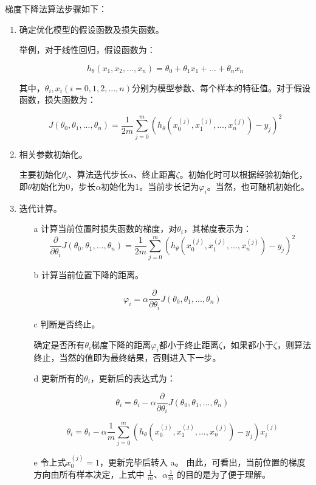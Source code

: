 梯度下降法算法步骤如下：

\begin{enumerate}
\itemsep0em

\item 确定优化模型的假设函数及损失函数。

举例，对于线性回归，假设函数为：

$$
  h_\theta(x_1,x_2,...,x_n)=\theta_0+\theta_1x_1+...+\theta_nx_n
$$

  其中，$\theta_i,x_i(i=0,1,2,...,n)$分别为模型参数、每个样本的特征值。对于假设函数，损失函数为：

$$
  J(\theta_0,\theta_1,...,\theta_n)=\frac{1}{2m}\sum^{m}_{j=0}(h_\theta (x^{(j)}_0
  	,x^{(j)}_1,...,x^{(j)}_n)-y_j)^2
$$

\item 相关参数初始化。

	主要初始化${\theta}_i$、算法迭代步长${\alpha} $、终止距离${\zeta} $。初始化时可以根据经验初始化，即${\theta} $初始化为0，步长${\alpha} $初始化为1。当前步长记为${\varphi}_i $。当然，也可随机初始化。

\item 迭代计算。

	\begin{enumerate}
	\itemsep0em
	\item[a] 计算当前位置时损失函数的梯度，对${\theta}_i $，其梯度表示为：
			$$
			\frac{\partial}{\partial \theta_i}J({\theta}_0,{\theta}_1,...,{\theta}_n)=\frac{1}{2m}\sum^{m}_{j=0}(h_\theta (x^{(j)}_0
				,x^{(j)}_1,...,x^{(j)}_n)-y_j)^2
			$$

		\item[b] 计算当前位置下降的距离。

			$$
			{\varphi}_i={\alpha} \frac{\partial}{\partial \theta_i}J({\theta}_0,{\theta}_1,...,{\theta}_n)
			$$

		\item[c] 判断是否终止。

			确定是否所有${\theta}_i$梯度下降的距离${\varphi}_i$都小于终止距离${\zeta}$，如果都小于${\zeta}$，则算法终止，当然的值即为最终结果，否则进入下一步。

		\item[d] 更新所有的${\theta}_i$，更新后的表达式为：

			$$
			{\theta}_i={\theta}_i-\alpha \frac{\partial}{\partial \theta_i}J({\theta}_0,{\theta}_1,...,{\theta}_n)
			$$

			$$
			\theta_i=\theta_i - \alpha \frac{1}{m} \sum^{m}_{j=0}(h_\theta (x^{(j)}_0
				,x^{(j)}_1,...,x^{(j)}_n)-y_j)x^{(j)}_i
			$$

		\item[e] 令上式$x^{(j)}_0=1$，更新完毕后转入 a。
		由此，可看出，当前位置的梯度方向由所有样本决定，上式中 $\frac{1}{m}$、$\alpha \frac{1}{m}$ 的目的是为了便于理解。
	\end{enumerate}
\end{enumerate}

